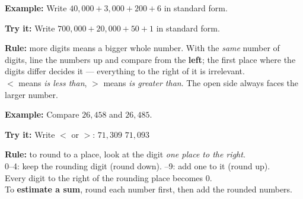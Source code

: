 \documentclass[12pt]{article}
\begin{document}
\begin{examplebox}
\textbf{Example:} \quad Write $40{,}000 + 3{,}000 + 200 + 6$ in standard form.
\end{examplebox}

\begin{tryitbox}
\textbf{Try it:} \quad Write $700{,}000 + 20{,}000 + 50 + 1$ in standard form.\\[2pt]
\end{tryitbox}


\begin{formulabox}
\textbf{Rule:} more digits means a bigger whole number. With the \emph{same} number of
digits, line the numbers up and compare from the \textbf{left}; the first place where the
digits differ decides it --- everything to the right of it is irrelevant.\\[3pt]
$<$ means \emph{is less than}, \quad $>$ means \emph{is greater than}. The open side always
faces the larger number.
\end{formulabox}

\begin{examplebox}
\textbf{Example:} \quad Compare $26{,}458$ and $26{,}485$.
\end{examplebox}

\begin{tryitbox}
\textbf{Try it:} \quad Write $<$ or $>$: \quad $71{,}309$ \underline{\hspace{0.9cm}} $71{,}093$\\[2pt]
\end{tryitbox}


\begin{formulabox}
\textbf{Rule:} to round to a place, look at the digit \emph{one place to the right}.\\[3pt]
0--4: keep the rounding digit (round down). --9: add one to it (round up).\\
Every digit to the right of the rounding place becomes 0.\\[3pt]
To \textbf{estimate a sum}, round each number first, then add the rounded numbers.
\end{formulabox}
\end{document}
